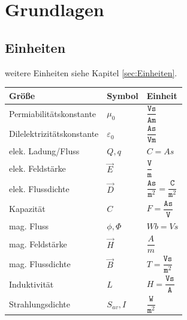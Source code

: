 \section{Grundlagen}
\subsection{Einheiten}
	weitere Einheiten siehe Kapitel \ref{sec:Einheiten}.
	\begin{table}[H]
		\renewcommand{\arraystretch}{2.15}
		\begin{tabularx}{0.9\columnwidth}{lXl}
			Größe                     & Symbol          & Einheit                                                              \\
			\hline
			Permiabilitätskonstante   & $\mu_0$         & $\dfrac{\texttt{Vs}}{\texttt{Am}}$                                   \\
			\hline
			Dilelektrizitätskonstante & $\varepsilon_0$ & $\dfrac{\texttt{As}}{\texttt{Vm}}$                                   \\
			\hline
			elek. Ladung/Fluss        & $ Q, q $        & $ C=As $                                                             \\
			\hline
			elek. Feldstärke          & $ \vec{E} $     & $\dfrac{\texttt{V}}{\texttt{m}}$                                     \\
			\hline
			elek. Flussdichte         & $ \vec{D} $     & $\dfrac{\texttt{As}}{\texttt{m}^2}=\dfrac{\texttt{C}}{\texttt{m}^2}$ \\
			\hline
			Kapazität                 & $C$             & $F= \dfrac{\texttt{As}}{\texttt{V}}$                                 \\
			\hline
			mag. Fluss                & $\phi, \Phi$    & $Wb = Vs$                                                            \\
			\hline
			mag. Feldstärke           & $\vec{H}$       & $\dfrac{A}{m}$                                                       \\
			\hline
			mag. Flussdichte          & $\vec{B}$       & $T = \dfrac{\texttt{Vs}}{\texttt{m}^2}$                              \\
			\hline
			Induktivität              & $L$             & $H = \dfrac{\texttt{Vs}}{\texttt{A}}$                                \\
			\hline
			Strahlungsdichte          & $S_{av}, I$     & $\dfrac{\texttt{W}}{\texttt{m}^2}$                                   \\
		\end{tabularx}
	\end{table}

